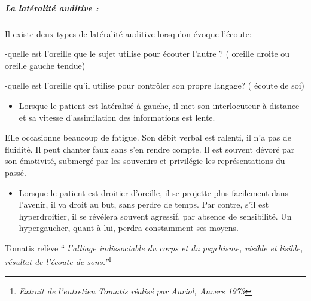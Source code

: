 \subparagraph{La latéralité auditive : }

Il existe deux types de latéralité auditive lorsqu'on évoque l'écoute:

-quelle est l'oreille que le sujet utilise pour écouter l'autre ?
( oreille droite ou oreille gauche tendue)

-quelle est l'oreille qu'il utilise pour contrôler son propre langage?
( écoute de soi)
\begin{itemize}
\item Lorsque le patient est latéralisé à gauche, il met son interlocuteur
à distance et sa vitesse d'assimilation des informations est lente.
\end{itemize}
Elle occasionne beaucoup de fatigue. Son débit verbal est ralenti,
il n'a pas de fluidité. Il peut chanter faux sans s'en rendre compte.
Il est souvent dévoré par son émotivité, submergé par les souvenirs
et privilégie les représentations du passé.
\begin{itemize}
\item Lorsque le patient est droitier d'oreille, il se projette plus facilement
dans l'avenir, il va droit au but, sans perdre de temps. Par contre,
s'il est hyperdroitier, il se révélera souvent agressif, par absence
de sensibilité. Un hypergaucher, quant à lui, perdra constamment ses
moyens.
\end{itemize}



Tomatis relève ``\emph{ l'alliage indissociable du corps et du psychisme,
visible et lisible, résultat de l'écoute de sons.''}\footnote{\emph{Extrait de l'entretien Tomatis réalisé par Auriol, Anvers 1973}}

